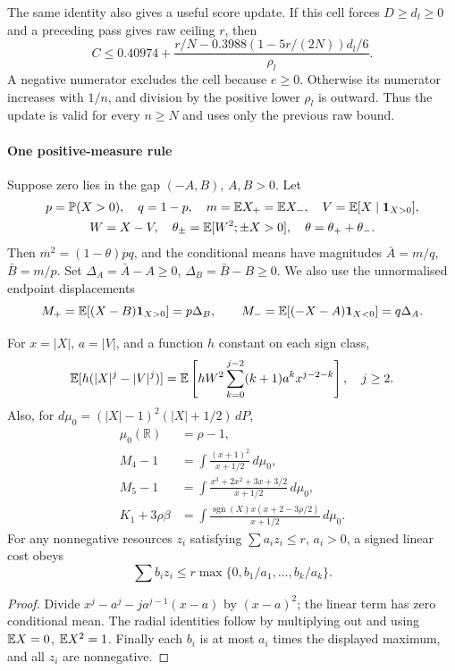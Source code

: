 The same identity also gives a useful score update. If this cell forces
$D\ge d_l\ge0$ and a preceding pass gives raw ceiling $r$, then
\[
 C\le 0.40974+
 \frac{r/N-0.3988(1-5r/(2N))d_l/6}{\rho_l}.
\]
A negative numerator excludes the cell because $e\ge0$. Otherwise its
numerator increases with $1/n$, and division by the positive lower
$\rho_l$ is outward. Thus the update is valid for every $n\ge N$ and
uses only the previous raw bound.

\paragraph{One positive-measure rule}
Suppose zero lies in the gap $(-A,B)$, $A,B>0$. Let
\[\begin{gathered}
 p=\mathbb P(X>0),\quad q=1-p,\quad m=\mathbb E X_+=\mathbb E X_-,\quad V=\mathbb E[X\mid\mathbf1_{X>0}],\\
 W=X-V,\quad\theta_\pm=\mathbb E[W^2;\pm X>0],\quad\theta=\theta_++\theta_-.
\end{gathered}\]
Then $m^2=(1-\theta)pq$, and the conditional means have magnitudes
$\bar A=m/q$, $\bar B=m/p$. Set
$\Delta_A=\bar A-A\ge0$, $\Delta_B=\bar B-B\ge0$.
We also use the unnormalised endpoint displacements
\[
 M_+=\mathbb E[(X-B)\mathbf1_{X>0}]=p\Delta_B,\qquad
 M_-=\mathbb E[(-X-A)\mathbf1_{X<0}]=q\Delta_A.
\]

\begin{lemma}\label{ms:fourier:rescore:re-pricing}
For $x=|X|$, $a=|V|$, and a function $h$ constant on each sign class,
\begin{equation}\label{ms:fourier:rescore:re-conditional}
 \mathbb E[h(|X|^j-|V|^j)]
 =\mathbb E\left[hW^2\sum_{k=0}^{j-2}(k+1)a^kx^{j-2-k}\right],\quad j\ge2.
\end{equation}
Also, for $d\mu_0=(|X|-1)^2(|X|+1/2)\,dP$,
\begin{align*}
 \mu_0(\mathbb R)&=\rho-1,\\
 M_4-1&=\int\frac{(x+1)^2}{x+1/2}\,d\mu_0,\\
 M_5-1&=\int\frac{x^3+2x^2+3x+3/2}{x+1/2}\,d\mu_0,\\
 K_1+3\rho\beta&=\int
  \frac{\operatorname{sgn}(X)x(x+2-3\rho/2)}{x+1/2}\,d\mu_0.
\end{align*}
For any nonnegative resources $z_i$ satisfying $\sum a_i z_i\le r$,
$a_i>0$, a signed linear cost obeys
\begin{equation}\label{ms:fourier:rescore:re-simplex}
 \sum b_i z_i\le r\max\{0,b_1/a_1,\ldots,b_k/a_k\}.
\end{equation}
\end{lemma}
\begin{proof}
Divide $x^j-a^j-ja^{j-1}(x-a)$ by $(x-a)^2$; the linear term has
zero conditional mean. The radial identities follow by multiplying
out and using $\mathbb E X=0$, $\mathbb E X^2=1$. Finally each $b_i$ is at most
$a_i$ times the displayed maximum, and all $z_i$ are nonnegative.
\end{proof}

